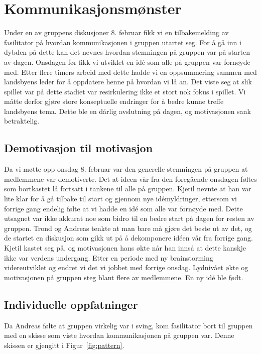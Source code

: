 
\section{Kommunikasjonsmønster} %
Under en av gruppens diskusjoner 8. februar fikk vi en tilbakemelding av
fasilitator på hvordan kommunikasjonen i gruppen utartet seg. For å gå
inn i dybden på dette kan det nevnes hvordan stemningen på gruppen var
på starten av dagen. Onsdagen før fikk vi utviklet en idé som alle på
gruppen var fornøyde med. Etter flere timers arbeid med dette hadde vi
en oppsummering sammen med landsbyens leder for å oppdatere henne på
hvordan vi lå an. Det viste seg at slik spillet var på dette stadiet var
resirkulering ikke et stort nok fokus i spillet. Vi måtte derfor gjøre
store konseptuelle endringer for å bedre kunne treffe landsbyens tema.
Dette ble en dårlig avslutning på dagen, og motivasjonen sank
betraktelig.

\subsection{Demotivasjon til motivasjon}
Da vi møtte opp onsdag 8. februar var den generelle stemningen på
gruppen at medlemmene var demotiverte. Det at ideen vår fra den
foregående onsdagen føltes som bortkastet lå fortsatt i tankene til alle
på gruppen. Kjetil nevnte at han var lite klar for å gå tilbake til
start og gjennom nye idémyldringer, ettersom vi forrige gang endelig
følte at vi hadde en idé som alle var fornøyde med. Dette utsagnet var
ikke akkurat noe som bidro til en bedre start på dagen for resten av
gruppen. Trond og Andreas tenkte at man bare må gjøre det beste ut av
det, og de startet en diskusjon som gikk ut på å dekomponere idéen vår
fra forrige gang. Kjetil kastet seg på, og motivasjonen hans økte når
han innså at dette kanskje ikke var verdens undergang. Etter en periode
med ny brainstorming videreutviklet og endret vi det vi jobbet med
forrige onsdag. Lydnivået økte og motivasjonen på gruppen steg blant
flere av medlemmene. En ny idé ble født.

\subsection{Individuelle oppfatninger}
Da Andreas følte at gruppen virkelig var i sving, kom fasilitator bort
til gruppen med en skisse som viste hvordan kommunikasjonen på gruppen
var. Denne skissen er gjengitt i Figur~\ref{fig:pattern}.

